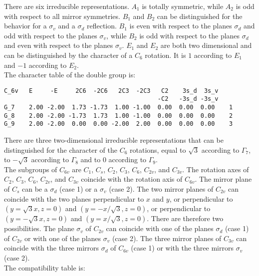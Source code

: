 \documentclass[12pt,a4paper,twoside]{report}
\begin{document}
There are six irreducible representations. $A_1$ is totally symmetric, while
$A_2$ is odd with respect to all mirror symmetries. $B_1$ and $B_2$ can be
distinguished for the behavior for a $\sigma_v$ and a
$\sigma_d$ reflection. $B_1$ is even with respect to the planes $\sigma_d$
and odd with respect to the planes $\sigma_v$, while $B_2$ is odd with
respect to the planes $\sigma_d$ and even with respect to the planes 
$\sigma_v$. $E_1$ and $E_2$ are both two dimensional and can be 
distinguished by the character of a $C_6$ rotation. It is
$1$ according to $E_1$ and $-1$ according to $E_2$.\\
The character table of the double group is:

\begin{tcolorbox}
\begin{footnotesize}
\begin{verbatim}
C_6v   E     -E     2C6  -2C6   2C3  -2C3   C2    3s_d  3s_v
                                           -C2   -3s_d -3s_v
G_7    2.00 -2.00  1.73 -1.73  1.00 -1.00  0.00  0.00  0.00    1
G_8    2.00 -2.00 -1.73  1.73  1.00 -1.00  0.00  0.00  0.00    2
G_9    2.00 -2.00  0.00  0.00 -2.00  2.00  0.00  0.00  0.00    3
\end{verbatim}
\end{footnotesize}
\end{tcolorbox}

There are three two-dimensional irreducible representations that can be 
distinguished for the character of the $C_6$ rotations, equal to $\sqrt{3}$
according to $\Gamma_7$, to $-\sqrt{3}$ according to $\Gamma_8$ and to
$0$ according to $\Gamma_9$.\\
The subgroups of $C_{6v}$ are $C_1$, $C_s$, $C_2$, $C_3$, $C_6$,
$C_{2v}$, and $C_{3v}$. The rotation axes of $C_2$, $C_3$, $C_6$, $C_{2v}$,
and $C_{3v}$ coincide with the rotation axis of $C_{6v}$. The mirror 
plane of $C_s$ can be a $\sigma_d$ (case 1) or a $\sigma_v$ (case 2). The two 
mirror planes of $C_{2v}$
can coincide with the two planes perpendicular to $x$ and $y$, 
or perpendicular to $(y=\sqrt{3} x, z=0)$ and $(y=-x /\sqrt{3}, z=0)$,
or perpendicular to $(y=-\sqrt{3} x, z=0)$ and $(y=x /\sqrt{3}, z=0)$.
There are therefore two possibilities. The plane $\sigma_v$ of $C_{2v}$
can coincide with one of the planes $\sigma_d$ (case 1) of $C_{2v}$
or with one of the planes $\sigma_v$ (case 2).
The three mirror planes of $C_{3v}$ can coincide with the three mirrors 
$\sigma_d$ of $C_{6v}$ (case 1) or with the three mirrors $\sigma_v$ (case 2).\\
The compatibility table is:
\end{document}
